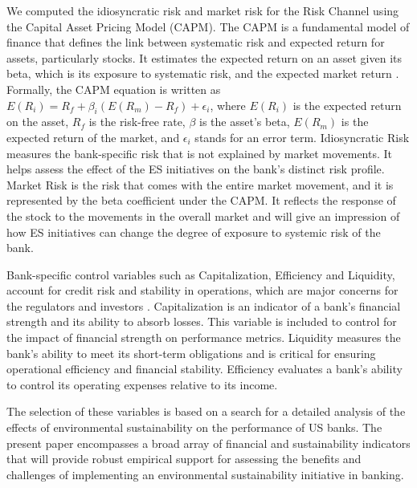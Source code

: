 \documentclass[11pt, a4paper]{article}
\begin{document}
We computed the idiosyncratic risk and market risk for the Risk Channel using the Capital Asset Pricing Model (CAPM). The CAPM is a fundamental model of finance that defines the link between systematic risk and expected return for assets, particularly stocks. It estimates the expected return on an asset given its beta, which is its exposure to systematic risk, and the expected market return \citep{Fama2004}. Formally, the CAPM equation is written as $E(R_i) = R_f + \beta_i (E(R_m) - R_f) + \epsilon_i$, where $E(R_i)$ is the expected return on the asset, $R_f$ is the risk-free rate, $\beta$ is the asset's beta, $E(R_m)$ is the expected return of the market, and $\epsilon_i$ stands for an error term. Idiosyncratic Risk measures the bank-specific risk that is not explained by market movements. It helps assess the effect of the ES initiatives on the bank's distinct risk profile. Market Risk is the risk that comes with the entire market movement, and it is represented by the beta coefficient under the CAPM. It reflects the response of the stock to the movements in the overall market and will give an impression of how ES initiatives can change the degree of exposure to systemic risk of the bank.

Bank-specific control variables such as Capitalization, Efficiency and Liquidity, account for credit risk and stability in operations, which are major concerns for the regulators and investors \citep{Chaarani2023, Velliscig2023}. Capitalization is an indicator of a bank's financial strength and its ability to absorb losses. This variable is included to control for the impact of financial strength on performance metrics. Liquidity measures the bank's ability to meet its short-term obligations and is critical for ensuring operational efficiency and financial stability. Efficiency evaluates a bank’s ability to control its operating expenses relative to its income. 

The selection of these variables is based on a search for a detailed analysis of the effects of environmental sustainability on the performance of US banks. The present paper encompasses a broad array of financial and sustainability indicators that will provide robust empirical support for assessing the benefits and challenges of implementing an environmental sustainability initiative in banking.
\end{document}
